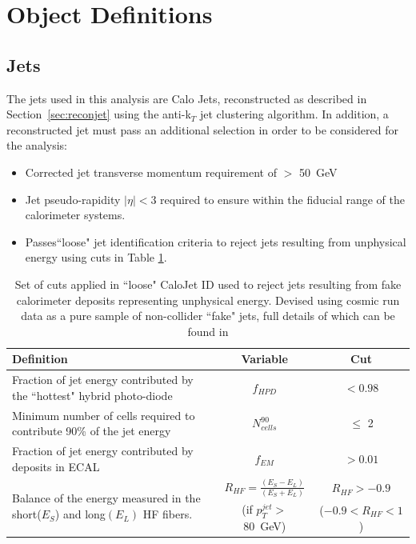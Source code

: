 \section{Object Definitions}

\subsection{Jets}
\label{sec:jetsel}
The jets used in this analysis are Calo Jets, reconstructed as described in Section~\ref{sec:reconjet} using the anti-k$_{T}$ jet clustering algorithm. In addition, a reconstructed jet must pass an additional selection in order to be considered for the analysis:
\begin{itemize}
\item Corrected jet transverse momentum requirement of \Pt $>$ 50~GeV 
\item Jet pseudo-rapidity $|\eta| < 3$ required to ensure within the fiducial range of the calorimeter systems. 
\item Passes``loose" jet identification criteria to reject jets resulting from unphysical energy using cuts in Table \ref{tab:jetid}. 
\end{itemize}

\begin{table}[htbp]
\centering
\begin{tabular}{ m{6.6cm}  c  c }
\hline
\hline
 \centering Definition & Variable & Cut \\
\hline
\hline
 \centering Fraction of jet energy contributed by the ``hottest" hybrid photo-diode &  $f_{HPD}$ & $< 0.98$ \\
 \centering Minimum number of cells required to contribute 90\% of the jet energy & $N^{90}_{cells}$ & $\leq$ 2 \\
 \centering Fraction of jet energy contributed by deposits in ECAL & $f_{EM}$ & $> 0.01$ \\
\multirow{2}{6.9cm}{Balance of the energy measured in the short($E_{S}$) and long$(E_{L})$ HF fibers.} &  $R_{HF} = \frac{(E_{S} - E_{L})}{ (E_{S} + E_{L})}$ & $R_{HF} > - 0.9$\\
& (if  $p_{T}^{jet}>$ 80~GeV)  &             ($-0.9 < R_{HF} < 1$)\\
\hline
\end{tabular}
\caption{\label{tab:jetid} Set of cuts applied in ``loose" CaloJet ID used to reject jets resulting from fake calorimeter deposits representing unphysical energy. Devised using cosmic run data as a pure sample of non-collider ``fake" jets, full details of which can be found in \cite{JME-09-008}}
\end{table}



